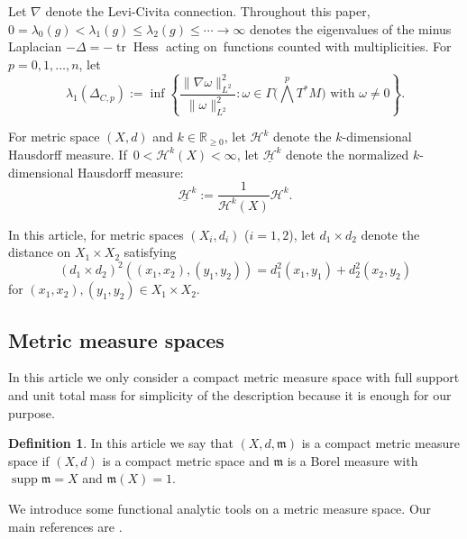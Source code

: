 \documentclass[pdftex]{sigma}
\numberwithin{equation}{section}
\theoremstyle{definition}
\newtheorem{Def}[Thm]{Definition}
\newcommand{\tr}{\operatorname{tr}}
\newcommand{\supp}{\operatorname{supp}}
\newcommand{\Hess}{\operatorname{Hess}}
\newcommand{\R}{\mathbb{R}}
\newcommand{\mf}{\mathfrak{m}}
\newcommand{\Ha}{\mathcal{H}}
\newcommand{\nHa}{\underline{\mathcal{H}}}
\begin{document}
Let $\nabla$ denote the Levi-Civita connection.
Throughout this paper,
 $0=\lambda_0(g)< \lambda_1(g) \leq \lambda_2(g) \leq\cdots \to \infty$
denotes the eigenvalues of the minus Laplacian $-\Delta=-\tr\Hess$ acting on~functions counted with multiplicities.
For $p=0,1,\ldots, n$, let
\[
\lambda_1(\Delta_{C,p}):=\inf\left\{\frac{\|\nabla \omega\|_{L^2}^2}{\|\omega\|_{L^2}^2}\colon \omega\in\Gamma\Big(\bigwedge^p T^\ast M\Big) \text{ with }\omega\neq 0\right\} .
\]

For metric space $(X,d)$ and $k\in\R_{\geq 0}$, let $\Ha^k$ denote the $k$-dimensional Hausdorff measure.
If~$0<\Ha^k(X)<\infty$, let $\nHa^k$ denote the normalized $k$-dimensional Hausdorff measure:
\[
\nHa^k:=\frac{1}{\Ha^k(X)}\Ha^k.
\]

In this article, for metric spaces $(X_i,d_i)$ ($i=1,2$), let $d_1\times d_2$ denote the distance on $X_1\times X_2$ satisfying
\[
(d_1\times d_2)^2\left((x_1,x_2),(y_1,y_2)\right)=d_1^2(x_1,y_1)+d_2^2(x_2,y_2)
\]
for $(x_1,x_2),(y_1,y_2)\in X_1\times X_2$.

\subsection{Metric measure spaces}
In this article we only consider a compact metric measure space with full support and unit total mass for simplicity of the description because it is enough for our purpose.
\begin{Def}
In this article we say that $(X,d,\mf)$ is a compact metric measure space if $(X,d)$ is a compact metric space and $\mf$ is a Borel measure with $\supp \mf =X$ and $\mf(X)=1$.
\end{Def}




We introduce some functional analytic tools on a metric measure space.
Our main references are \cite{AGS1, Gig,GP}.
\end{document}
